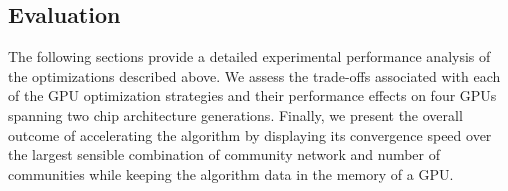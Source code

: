 \subsection{Evaluation}
\label{sec-evaluation}

The following sections provide a detailed experimental performance analysis
of the optimizations described above.
%
We assess the trade-offs associated with each of the GPU optimization
strategies and their performance effects on four GPUs spanning two chip
architecture generations.
%
Finally, we present the overall outcome of accelerating the algorithm by
displaying its convergence speed over the largest sensible combination of
community network and number of communities while keeping the algorithm data
in the memory of a GPU.




% 


